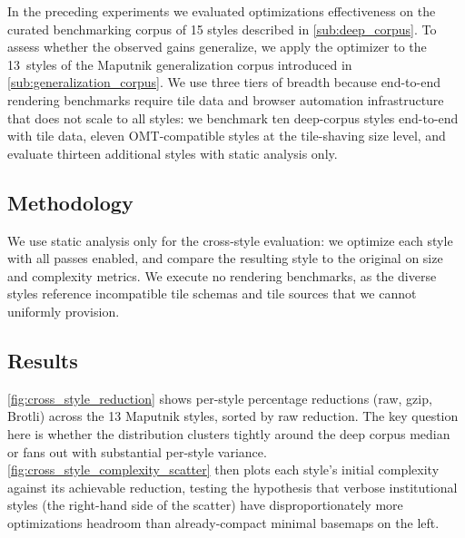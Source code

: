 \noindent In the preceding experiments we evaluated optimizations effectiveness on the curated benchmarking corpus of 15 styles described in \cref{sub:deep_corpus}.
To assess whether the observed gains generalize, we apply the optimizer to the 13~styles of the Maputnik generalization corpus introduced in \cref{sub:generalization_corpus}.
We use three tiers of breadth because end-to-end rendering benchmarks require tile data and browser automation infrastructure that does not scale to all styles: we benchmark ten deep-corpus styles end-to-end with tile data, eleven \ac{OMT}-compatible styles at the tile-shaving size level, and evaluate thirteen additional styles with static analysis only.

\subsection{Methodology}\label{sub:cross_methodology}

We use static analysis only for the cross-style evaluation: we optimize each style with all passes enabled, and compare the resulting style to the original on size and complexity metrics.
We execute no rendering benchmarks, as the diverse styles reference incompatible tile schemas and tile sources that we cannot uniformly provision.

\subsection{Results}\label{sub:cross_results}

\cref{fig:cross_style_reduction} shows per-style percentage reductions (raw, gzip, Brotli) across the 13 Maputnik styles, sorted by raw reduction.
The key question here is whether the distribution clusters tightly around the deep corpus median or fans out with substantial per-style variance.
\cref{fig:cross_style_complexity_scatter} then plots each style's initial complexity against its achievable reduction, testing the hypothesis that verbose institutional styles (the right-hand side of the scatter) have disproportionately more optimizations headroom than already-compact minimal basemaps on the left.


